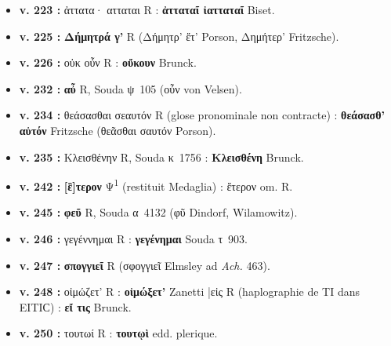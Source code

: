 \documentclass[10pt, a4paper, twoside]{book}
\renewcommand{\_}{\origunderscore\penalty0\relax}
\providecommand{\italique}[1]{\emph{#1}}
\providecommand{\lecon}[1]{\textbf{#1}}
\providecommand{\PsiUn}{\textgreek{Ψ}\textsuperscript{1}}
\providecommand{\espApp}{\hspace{0.5em}|\hspace{0.5em}}
\begin{document}
\begin{itemize}
\begin{itemize}
    \item \textbf{v. 223 :} ἀττατα· ατταται R : \lecon{ἀτταταῖ ἰατταταῖ} Biset.
    \item \textbf{v. 225 :} \lecon{Δήμητρά γ'} R (Δήμητρ' ἔτ' Porson, Δημήτερ' Fritzsche).
    \item \textbf{v. 226 :} οὐκ οὖν R : \lecon{οὔκουν} Brunck.
    \item \textbf{v. 232 :} \lecon{αὖ} R, Souda ψ~105 (οὖν von Velsen).
    \item \textbf{v. 234 :} θεάσασθαι σεαυτόν R (glose pronominale non contracte) : \lecon{θεάσασθ' αὑτόν} Fritzsche (θεᾶσθαι σαυτόν Porson).
    \item \textbf{v. 235 :} Κλεισθένην R, Souda κ~1756 : \lecon{Κλεισθένη} Brunck.
    \item \textbf{v. 242 :} \lecon{[ἓ]τερον} \PsiUn{} (restituit Medaglia) : ἕτερον om. R.
    \item \textbf{v. 245 :} \lecon{φεῦ} R, Souda α~4132 (φῦ Dindorf, Wilamowitz).
    \item \textbf{v. 246 :} γεγέννημαι R : \lecon{γεγένημαι} Souda τ~903.
    \item \textbf{v. 247 :} \lecon{σπογγιεῖ} R (σφογγιεῖ Elmsley ad \italique{Ach.} 463).
    \item \textbf{v. 248 :} οἰμώζετ' R : \lecon{οἰμώξετ'} Zanetti \espApp εἰς R (haplographie de ΤΙ dans ΕΙΤΙϹ) : \lecon{εἴ τις} Brunck.
    \item \textbf{v. 250 :} τουτωί R : \lecon{τουτῳὶ} edd. plerique.
  \end{itemize}
\end{itemize}
\end{document}
